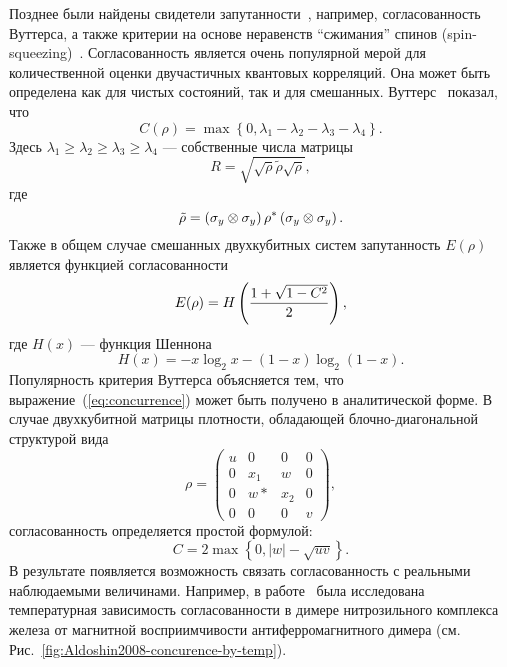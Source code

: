 

Позднее были найдены свидетели запутанности~\cite{Wootters1998, Bourennane2004, Kaszlikowski2008, Krammer2009, Bancal2011},
например, согласованность Вуттерса,
а также критерии на основе неравенств ``сжимания'' спинов (spin-squeezing)~\cite{Sorensen2001, Durkin2005, Vitagliano2011, Duan2011}.
Согласованность является очень популярной мерой для количественной оценки двучастичных квантовых корреляций.
Она может быть определена как для чистых состояний,
так и для смешанных.
Вуттерс~\cite{Wootters1998} показал, что
%
\begin{equation}\label{eq:concurrence}
  C(\rho)
  = \max\left\{0, \lambda_1 - \lambda_2  - \lambda_3  - \lambda_4\right\}.
\end{equation}
%
Здесь $\lambda_1 \geq \lambda_2 \geq \lambda_3 \geq \lambda_4$ --- собственные числа матрицы
%
\begin{equation}
  R = \sqrt{\sqrt{\rho}\tilde{\rho}\sqrt{\rho}},
\end{equation}
где
%
\begin{equation}
  \tilde\rho = \left( \sigma_y \otimes \sigma_y \right)
    \rho^* \left( \sigma_y \otimes \sigma_y \right).
\end{equation}
%
Также в общем случае смешанных двухкубитных систем запутанность $E(\rho)$ является функцией согласованности
\begin{equation}
  E(\rho) = H\left( \dfrac{1 + \sqrt{1 - C^2}}{2} \right),
\end{equation}
%
где $H(x)$ --- функция Шеннона~\cite{Shannon1948}
%
\begin{equation}
  H(x) = -x \log_2 x - (1 - x)\log_2(1 - x).
\end{equation}
%
Популярность критерия Вуттерса объясняется тем,
что выражение~(\ref{eq:concurrence}) может быть получено в аналитической форме.
В случае двухкубитной матрицы плотности, обладающей блочно-диагональной структурой вида
%
\begin{equation}
  \rho = \begin{pmatrix}
    u &  0  &  0  & 0 \\
    0 & x_1 &  w  & 0 \\
    0 &  w* & x_2 & 0 \\
    0 &  0  &  0  & v
  \end{pmatrix},
\end{equation}
%
согласованность определяется простой формулой:
%
\begin{equation}
  C = 2 \max\left\{0, |w| - \sqrt{uv} \right\}.
\end{equation}
%
В результате появляется возможность связать согласованность с реальными наблюдаемыми величинами.
Например, в работе~\cite{Aldoshin2008} была исследована температурная зависимость согласованности
в димере нитрозильного комплекса железа от магнитной восприимчивости антиферромагнитного димера (см. Рис.~\ref{fig:Aldoshin2008-concurence-by-temp}).

